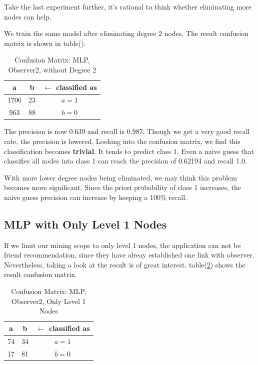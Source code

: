 \documentclass[11pt,a4paper]{article}
\begin{document}
Take the last experiment further, it's rational to 
think whether eliminating more nodes can help. 

We train the same model after eliminating degree 2 nodes. 
The result confusion matrix is shown in table().

\begin{table}[htb]
	\centering
	\caption{Confusion Matrix: MLP, Observer2, without Degree 2}
	\label{tbl:cm_o2_d2}
	\begin{tabular}{cc|c}
	\hline
a & b & \textbf{$\leftarrow$ classified as}\\	
	\hline
 1706 &23 &    $a = 1$\\
  963 &88 &    $b = 0$\\
	\hline
	\end{tabular}
\end{table}

The precision is now 0.639 and recall is 0.987. 
Though we get a very good recall rate, the precision 
is lowered. Looking into the confusion matrix, 
we find this classification becomes \textbf{trivial}. 
It tends to predict class 1. Even a naive guess 
that classifies all nodes into class 1 can reach 
the precision of 0.62194 and recall 1.0. 

With more lower degree nodes being eliminated, 
we may think this problem becomes more significant. 
Since the priori probability of class 1 increases, 
the naive guess precision can increase by keeping 
a 100\% recall. 

\subsection{MLP with Only Level 1 Nodes}

If we limit our mining scope to only level 1 nodes, 
the application can not be friend recommendation, since 
they have alreay established one link with observer. 
Nevertheless, taking a look at the result is of great interest. 
table(\ref{tbl:cm_o2_l1}) shows the result confusion matrix. 

\begin{table}[htb]
	\centering
	\caption{Confusion Matrix: MLP, Observer2, Only Level 1 Nodes}
	\label{tbl:cm_o2_l1}
	\begin{tabular}{cc|c}
	\hline
a & b & \textbf{$\leftarrow$ classified as}\\	
	\hline
 74 &34 &    $a = 1$\\
  17 &81 &    $b = 0$\\
	\hline
	\end{tabular}
\end{table}
\end{document}
